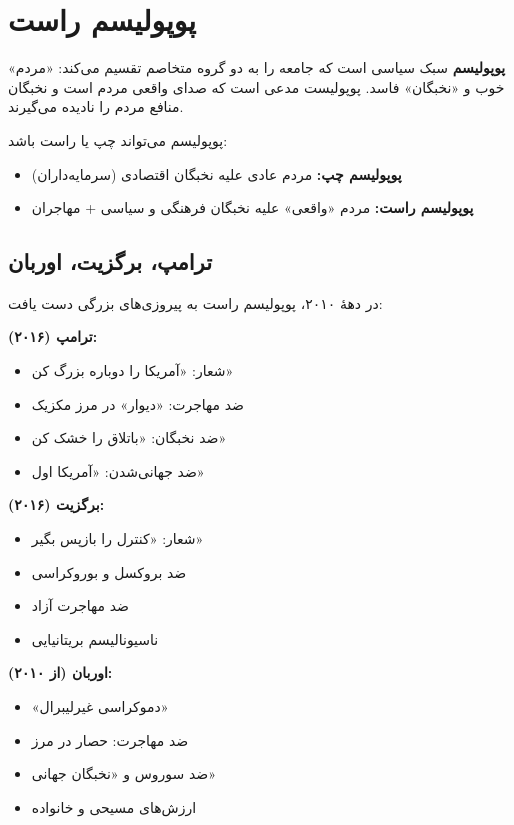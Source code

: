 \section{پوپولیسم راست}

\begin{tcolorbox}[
    enhanced,
    colback=rightblue!8,
    colframe=rightblue,
    boxrule=1.5pt,
    arc=5pt,
    fonttitle=\bfseries,
    title={\rl{🔵 تعریف کلیدی: پوپولیسم}}
]
\textbf{پوپولیسم} سبک سیاسی است که جامعه را به دو گروه متخاصم تقسیم می‌کند: «مردم» خوب و «نخبگان» فاسد. پوپولیست مدعی است که صدای واقعی مردم است و نخبگان منافع مردم را نادیده می‌گیرند.

پوپولیسم می‌تواند چپ یا راست باشد:
\begin{itemize}
    \item \textbf{پوپولیسم چپ:} مردم عادی علیه نخبگان اقتصادی (سرمایه‌داران)
    \item \textbf{پوپولیسم راست:} مردم «واقعی» علیه نخبگان فرهنگی و سیاسی + مهاجران
\end{itemize}
\end{tcolorbox}

\subsection{ترامپ، برگزیت، اوربان}


در دههٔ ۲۰۱۰، پوپولیسم راست به پیروزی‌های بزرگی دست یافت:

\textbf{ترامپ (۲۰۱۶):}
\begin{itemize}
    \item شعار: «آمریکا را دوباره بزرگ کن»
    \item ضد مهاجرت: «دیوار» در مرز مکزیک
    \item ضد نخبگان: «باتلاق را خشک کن»
    \item ضد جهانی‌شدن: «آمریکا اول»
\end{itemize}

\textbf{برگزیت (۲۰۱۶):}
\begin{itemize}
    \item شعار: «کنترل را بازپس بگیر»
    \item ضد بروکسل و بوروکراسی
    \item ضد مهاجرت آزاد
    \item ناسیونالیسم بریتانیایی
\end{itemize}

\textbf{اوربان (از ۲۰۱۰):}
\begin{itemize}
    \item «دموکراسی غیرلیبرال»
    \item ضد مهاجرت: حصار در مرز
    \item ضد سوروس و «نخبگان جهانی»
    \item ارزش‌های مسیحی و خانواده
\end{itemize}


